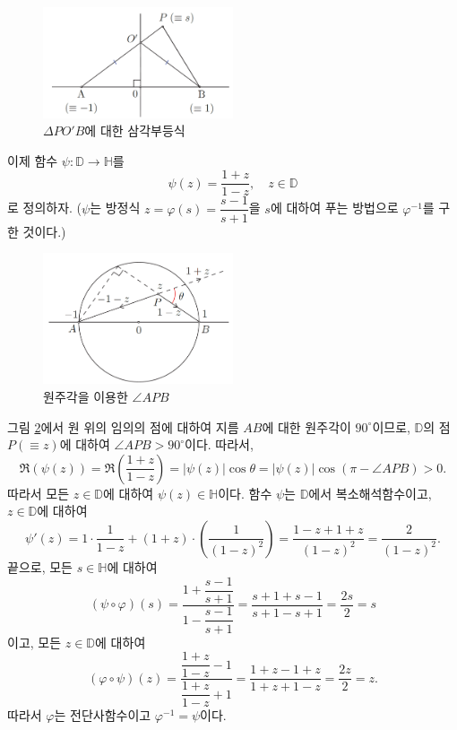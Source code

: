 \begin{itemize}
\begin{figure}[t!]
\begin{center}
\includegraphics[width=0.5\textwidth]{./Solution/figs/fig-5-24}
\end{center}
\caption{$\Delta PO'B$에 대한 삼각부등식
}
\label{fig-5-24}
\end{figure}

이제 함수  $\psi: \mathbb D \to \mathbb H$를
\[
\psi(z) = \dfrac{1+z}{1-z}, \quad z\in\mathbb D
\]
로 정의하자.
($\psi$는
방정식 $z= \varphi(s) = \dfrac{s-1}{s+1}$을 $s$에 대하여 푸는 방법으로
$\varphi^{-1}$를 구한 것이다.)

\begin{figure}[h!]
\begin{center}
\includegraphics[width=0.5\textwidth]{./Solution/figs/fig-5-25}
\end{center}
\caption{원주각을 이용한 $\angle APB$
}
\label{fig-5-25}
\end{figure}

그림 \ref{fig-5-25}에서 원 위의 임의의 점에 대하여
지름 $AB$에 대한 원주각이 $90^\circ$이므로,
$\mathbb D$의 점 $P(\equiv z)$에 대하여
$\angle APB >90^\circ$이다. 따라서,
\[
\Re(\psi(z)) = \Re\left( \dfrac{1+z}{1-z} \right)
= |\psi(z)| \cos\theta = |\psi(z)| \cos(\pi - \angle APB) >0.
\]
따라서 모든 $z\in \mathbb D$에 대하여 $\psi(z)\in \mathbb H$이다.
함수 $\psi$는 $\mathbb D$에서 복소해석함수이고, $z\in\mathbb D$에 대하여
\[
\psi'(z) = 1\cdot \dfrac1{1-z} + (1+z)\cdot \left(\dfrac1{(1-z)^2}\right)
= \dfrac{1-z+1+z}{(1-z)^2} = \dfrac2{(1-z)^2}.
\]
끝으로, 모든 $s\in\mathbb H$에 대하여
\[
(\psi\circ \varphi)(s) = \dfrac{1+\dfrac{s-1}{s+1}}{1-\dfrac{s-1}{s+1}}
= \dfrac{s+1+s-1}{s+1-s+1} = \dfrac{2s}2 = s
\]
이고, 모든 $z\in\mathbb D$에 대하여 
\[
(\varphi\circ\psi)(z) = \dfrac{\dfrac{1+z}{1-z}-1}{\dfrac{1+z}{1-z}+1}
= \dfrac{1+z-1+z}{1+z+1-z} = \dfrac{2z}2 = z.
\]
따라서 $\varphi$는 전단사함수이고 $\varphi^{-1}=\psi$이다.


\end{itemize}

